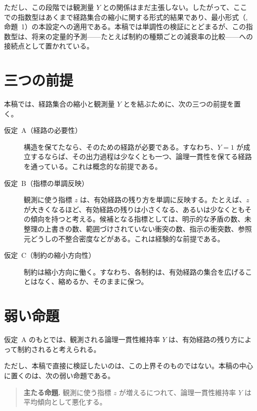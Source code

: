 \documentclass[12pt,a4paper]{article}
\begin{document}
ただし、この段階では観測量 $Y$ との関係はまだ主張しない。したがって、ここでの指数型はあくまで経路集合の縮小に関する形式的結果であり、最小形式（\cite{paper1}, 命題~1）の本設定への適用である。本稿では単調性の検証にとどまるが、この指数型は、将来の定量的予測——たとえば制約の種類ごとの減衰率の比較——への接続点として置かれている。

\section{三つの前提}

本稿では、経路集合の縮小と観測量 $Y$ とを結ぶために、次の三つの前提を置く。

\begin{description}
  \item[仮定~A（経路の必要性）]
  構造を保てたなら、そのための経路が必要である。すなわち、$Y = 1$ が成立するならば、その出力過程は少なくとも一つ、論理一貫性を保てる経路を通っている。これは概念的な前提である。

  \item[仮定~B（指標の単調反映）]
  観測に使う指標 $z$ は、有効経路の残り方を単調に反映する。たとえば、$z$ が大きくなるほど、有効経路の残りは小さくなる、あるいは少なくともその傾向を持つと考える。候補となる指標としては、明示的な矛盾の数、未整理の上書きの数、範囲づけされていない衝突の数、指示の衝突数、参照元どうしの不整合密度などがある。これは経験的な前提である。

  \item[仮定~C（制約の縮小方向性）]
  制約は縮小方向に働く。すなわち、各制約は、有効経路の集合を広げることはなく、縮めるか、そのままに保つ。
\end{description}

\section{弱い命題}\label{sec:weak-claim}

仮定~A のもとでは、観測される論理一貫性維持率 $Y$ は、有効経路の残り方によって制約されると考えられる。

ただし、本稿で直接に検証したいのは、この上界そのものではない。本稿の中心に置くのは、次の弱い命題である。

\begin{quote}
\textbf{主たる命題.}
観測に使う指標 $z$ が増えるにつれて、論理一貫性維持率 $Y$ は平均傾向として悪化する。
\end{quote}
\end{document}
